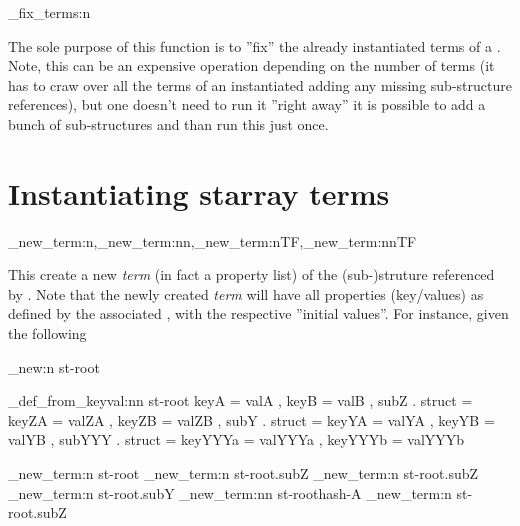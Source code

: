 \documentclass[10pt]{article}
\begin{document}
\begin{codedescribe}{\starray_fix_terms:n}
\begin{codesyntax}%
\end{codesyntax}
\end{codedescribe}
The sole purpose of this function is to ''fix'' the already instantiated terms of a . Note, this can be an expensive operation depending on the number of terms (it has to craw over all the terms of an instantiated  adding any missing sub-structure references), but one doesn't need to run it ''right away'' it is possible to add a bunch of sub-structures and than run this just once.


\section{Instantiating starray terms}\label{pack:instantiate}

\begin{codedescribe}{\starray_new_term:n,\starray_new_term:nn,\starray_new_term:nTF,\starray_new_term:nnTF}
\begin{codesyntax}%
\end{codesyntax}
\end{codedescribe}
This create a new \textsl{term} (in fact a property list) of the (sub-)struture referenced by . Note that the newly created \textsl{term} will have all properties (key/values) as defined by the associated , with the respective ''initial values''. For instance, given the following 

\begin{codestore}[store-env=keyval.demo2]
\starray_new:n {st-root}

\starray_def_from_keyval:nn {st-root} 
  {
    keyA = valA ,
    keyB = valB ,
    subZ . struct = 
      {
        keyZA = valZA ,
        keyZB = valZB ,
      }
    subY . struct =
      {
        keyYA = valYA ,
        keyYB = valYB ,
        subYYY . struct =
          {
            keyYYYa = valYYYa ,
            keyYYYb = valYYYb 
          }
      }
  }
  
\starray_new_term:n {st-root}
\starray_new_term:n {st-root.subZ}
\starray_new_term:n {st-root.subZ}
\starray_new_term:n {st-root.subY}
\starray_new_term:nn {st-root}{hash-A}
\starray_new_term:n {st-root.subZ}
\end{codestore}
\end{document}
